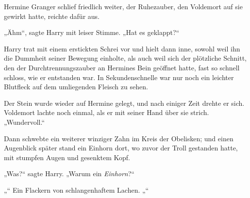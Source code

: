 Hermine Granger schlief friedlich weiter, der Ruhezauber, den Voldemort auf sie gewirkt hatte, reichte dafür aus.

„Ähm“, sagte Harry mit leiser Stimme.
„Hat es geklappt?“


Harry trat mit einem erstickten Schrei vor und hielt dann inne, sowohl weil ihn die Dummheit seiner Bewegung einholte, als auch weil sich der plötzliche Schnitt, den der Durchtrennungszauber an Hermines Bein geöffnet hatte, fast so schnell schloss, wie er entstanden war. In Sekundenschnelle war nur noch ein leichter Blutfleck auf dem umliegenden Fleisch zu sehen.

Der Stein wurde wieder auf Hermine gelegt, und nach einiger Zeit drehte er sich.
Voldemort lachte noch einmal, als er mit seiner Hand über sie strich.
„Wundervoll.“

Dann schwebte ein weiterer winziger Zahn im Kreis der Obelisken; und einen Augenblick später stand ein Einhorn dort, wo zuvor der Troll gestanden hatte, mit stumpfen Augen und gesenktem Kopf.

„Was?“ sagte Harry.
„Warum ein \emph{Einhorn}?“

„“
Ein Flackern von schlangenhaftem Lachen.
„“

